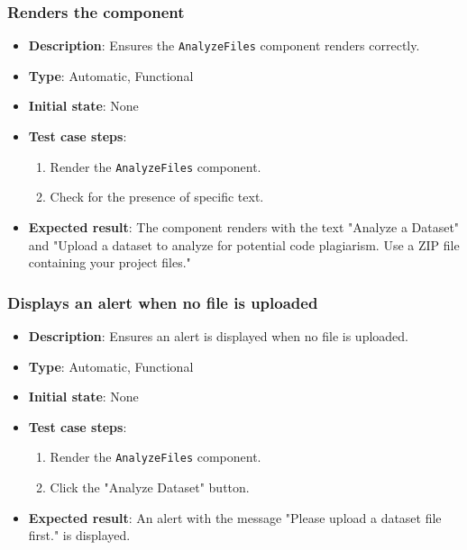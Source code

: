 \documentclass[12pt, titlepage]{article}
\begin{document}
\subsubsection{Renders the component}
\begin{itemize}
    \item \textbf{Description}: Ensures the \texttt{AnalyzeFiles} component renders correctly.
    \item \textbf{Type}: Automatic, Functional
    \item \textbf{Initial state}: None
    \item \textbf{Test case steps}:
    \begin{enumerate}
        \item Render the \texttt{AnalyzeFiles} component.
        \item Check for the presence of specific text.
    \end{enumerate}
    \item \textbf{Expected result}: The component renders with the text "Analyze a Dataset" and "Upload a dataset to analyze for potential code plagiarism. Use a ZIP file containing your project files."
\end{itemize}

\subsubsection{Displays an alert when no file is uploaded}
\begin{itemize}
    \item \textbf{Description}: Ensures an alert is displayed when no file is uploaded.
    \item \textbf{Type}: Automatic, Functional
    \item \textbf{Initial state}: None
    \item \textbf{Test case steps}:
    \begin{enumerate}
        \item Render the \texttt{AnalyzeFiles} component.
        \item Click the "Analyze Dataset" button.
    \end{enumerate}
    \item \textbf{Expected result}: An alert with the message "Please upload a dataset file first." is displayed.
\end{itemize}
\end{document}
